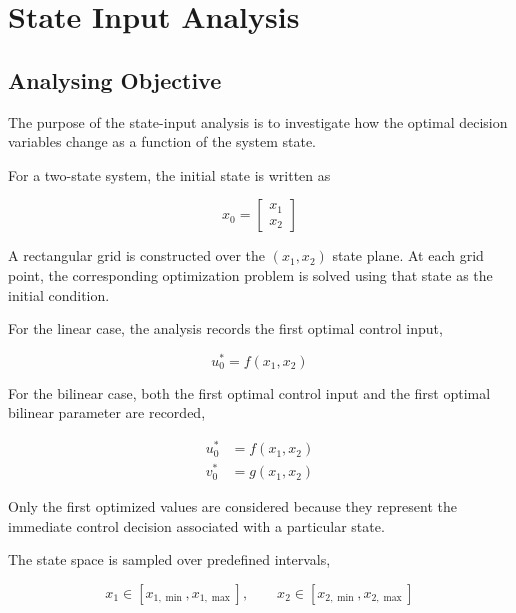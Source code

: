 \chapter{State Input Analysis}


\section{Analysing Objective}
\label{sec:state_input_objective}

The purpose of the state-input analysis is to investigate how the optimal
decision variables change as a function of the system state.

For a two-state system, the initial state is written as

\begin{equation}
    x_0 =
    \begin{bmatrix}
        x_1 \\
        x_2
    \end{bmatrix}
\end{equation}

A rectangular grid is constructed over the \((x_1,x_2)\) state plane. At
each grid point, the corresponding optimization problem is solved using that
state as the initial condition.

For the linear case, the analysis records the first optimal control input,

\begin{equation}
    u_0^\ast
    =
    f(x_1,x_2)
\end{equation}

For the bilinear case, both the first optimal control input and the first
optimal bilinear parameter are recorded,

\begin{align}
    u_0^\ast
    &=
    f(x_1,x_2)\\
    v_0^\ast
    &=
    g(x_1,x_2)
\end{align}

Only the first optimized values are considered because they represent the
immediate control decision associated with a particular state.

The state space is sampled over predefined intervals,

\begin{equation}
    x_1 \in
    [x_{1,\min},x_{1,\max}],
    \qquad
    x_2 \in
    [x_{2,\min},x_{2,\max}]
\end{equation}

